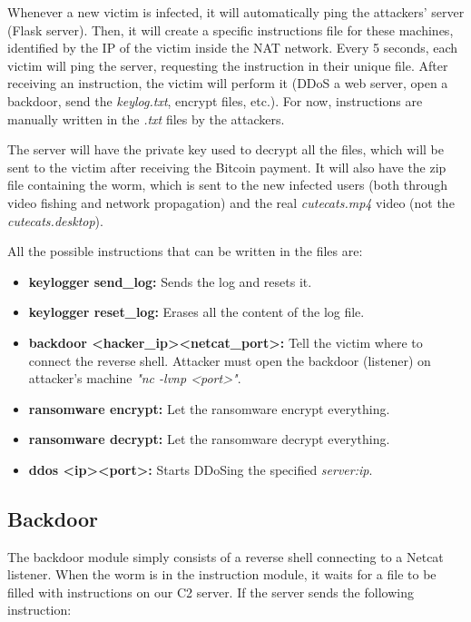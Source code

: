 Whenever a new victim is infected, it will automatically ping the attackers' server (Flask server). Then, it will create a specific instructions file for these machines, identified by the IP of the victim inside the NAT network. Every 5 seconds, each victim will ping the server, requesting the instruction in their unique file. After receiving an instruction, the victim will perform it (DDoS a web server, open a backdoor, send the \textit{keylog.txt}, encrypt files, etc.). For now, instructions are manually written in the \textit{.txt} files by the attackers.

The server will have the private key used to decrypt all the files, which will be sent to the victim after receiving the Bitcoin payment. It will also have the zip file containing the worm, which is sent to the new infected users (both through video fishing and network propagation) and the real \textit{cutecats.mp4} video (not the \textit{cutecats.desktop}). 

All the possible instructions that can be written in the files are:

\begin{itemize}
    \item \textbf{keylogger send\_log:} Sends the log and resets it.
    \item \textbf{keylogger reset\_log:} Erases all the content of the log file.
    \item \textbf{backdoor \textless hacker\_ip\textgreater \textless netcat\_port\textgreater:} Tell the victim where to connect the reverse shell. Attacker must open the backdoor (listener) on attacker's machine \textit{"nc -lvnp \textless port\textgreater"}.
    \item \textbf{ransomware encrypt:} Let the ransomware encrypt everything.
    \item \textbf{ransomware decrypt:} Let the ransomware decrypt everything.
    \item \textbf{ddos \textless ip\textgreater \textless port\textgreater:} Starts DDoSing the specified \textit{server:ip}.
\end{itemize}


\subsection{Backdoor}
\label{sec:backdoor}

The backdoor module simply consists of a reverse shell connecting to a Netcat listener. When the worm is in the instruction module, it waits for a file to be filled with instructions on our C2 server. If the server sends the following instruction:

